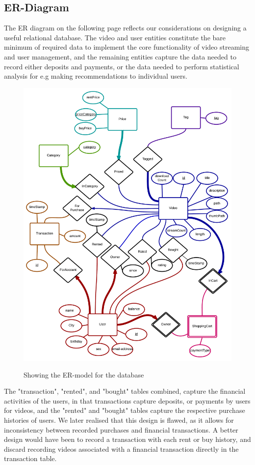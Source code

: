 \subsection{ER-Diagram}
The ER diagram on the following page reflects our considerations on designing a useful relational database. The video and user entities constitute the bare minimum of required data to implement the core functionality of video streaming and user management, and the remaining entities capture the data needed to record either deposits and payments, or the data needed to perform statistical analysis for e.g making recommendations to individual users.
\begin{figure}[H]
\centering
\includegraphics[scale=0.2]{ERDiagram.png}
\label{ERdiagram}
\caption{Showing the ER-model for the database}
\end{figure}
The "transaction", "rented", and "bought" tables combined, capture the financial activities of the users, in that transactions capture deposits, or payments by users for videos, and the "rented" and "bought" tables capture the respective purchase histories of users.
We later realised that this design is flawed, as it allows for inconsistency between recorded purchases and financial transactions. A better design would have been to record a transaction with each rent or buy history, and discard recording videos associated with a financial transaction directly in the transaction table.

